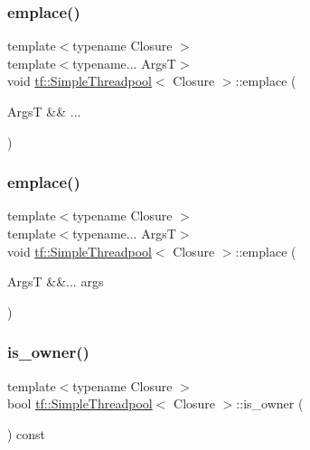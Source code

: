 \mbox{\label{classtf_1_1SimpleThreadpool_ad64bf6fa31065d1f4ccfe22c20d29a51}} 
\subsubsection{\texorpdfstring{emplace()}{emplace()}\hspace{0.1cm}{\footnotesize\ttfamily [1/2]}}
{\footnotesize\ttfamily template$<$typename Closure $>$ \\
template$<$typename... ArgsT$>$ \\
void \hyperlink{classtf_1_1SimpleThreadpool}{tf\+::\+Simple\+Threadpool}$<$ Closure $>$\+::emplace (\begin{DoxyParamCaption}\item[{ArgsT \&\&}]{... }\end{DoxyParamCaption})}

\mbox{\label{classtf_1_1SimpleThreadpool_abcd89eaa2c7bd7f4139587cb531229c2}} 
\subsubsection{\texorpdfstring{emplace()}{emplace()}\hspace{0.1cm}{\footnotesize\ttfamily [2/2]}}
{\footnotesize\ttfamily template$<$typename Closure $>$ \\
template$<$typename... ArgsT$>$ \\
void \hyperlink{classtf_1_1SimpleThreadpool}{tf\+::\+Simple\+Threadpool}$<$ Closure $>$\+::emplace (\begin{DoxyParamCaption}\item[{ArgsT \&\&...}]{args }\end{DoxyParamCaption})}

\mbox{\label{classtf_1_1SimpleThreadpool_a7dedd805ca19fa696d5f6df42ae0fcf8}} 
\subsubsection{\texorpdfstring{is\+\_\+owner()}{is\_owner()}}
{\footnotesize\ttfamily template$<$typename Closure $>$ \\
bool \hyperlink{classtf_1_1SimpleThreadpool}{tf\+::\+Simple\+Threadpool}$<$ Closure $>$\+::is\+\_\+owner (\begin{DoxyParamCaption}{ }\end{DoxyParamCaption}) const}

